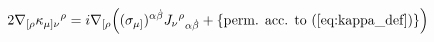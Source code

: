 \begin{equation}
2\nabla_{[\rho} \kappa_{\mu]\nu}{}^{\rho} = i\nabla_{[\rho} \Big(
(\sigma_{\mu]})^{\alpha\dot\beta} J_\nu{}^\rho{}_{\alpha\dot\beta} + \{\mbox{perm. acc. to (\ref{eq:kappa_def})}\} \Big)
\end{equation}


